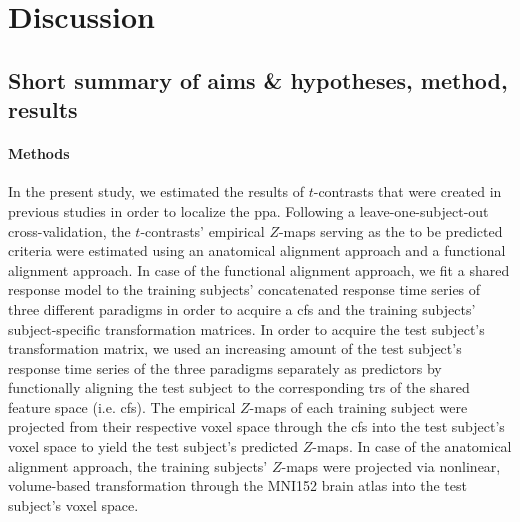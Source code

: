 


\pagebreak


\section{Discussion}



\subsection{Short summary of aims \& hypotheses, method, results}





\paragraph{Methods}
%
In the present study, we estimated the results of $t$-contrasts that were
created in previous studies \citep{sengupta2016extension,
haeusler2022processing} in order to localize the \ac{ppa}.
%
Following a leave-one-subject-out cross-validation, the $t$-contrasts' empirical
$Z$-maps serving as the to be predicted criteria were estimated using an
anatomical alignment approach \citep[cf.][]{zhen2015quantifying,
zhen2017quantifying} and a functional alignment approach.
%
In case of the functional alignment approach, we fit a shared response model
\citep{chen2015reduced} to the training subjects' concatenated response time
series of three different paradigms in order to acquire a \ac{cfs} and the
training subjects' subject-specific transformation matrices.
%
In order to acquire the test subject's transformation matrix, we used an
increasing amount of the test subject's response time series of the three
paradigms separately as predictors by functionally aligning the test subject
to the corresponding \acp{tr} of the shared feature space (i.e. \ac{cfs}).
%
The empirical $Z$-maps of each training subject were projected from their
respective voxel space through the \ac{cfs} into the test subject's voxel space
to yield the test subject's predicted $Z$-maps.
%
In case of the anatomical alignment approach, the training subjects' $Z$-maps
were projected via nonlinear, volume-based transformation through the MNI152
brain atlas  into the test subject's voxel space.

